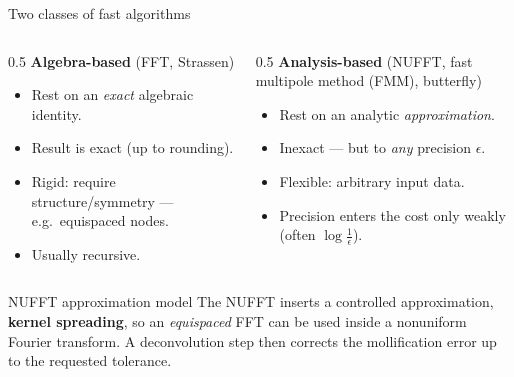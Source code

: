 \documentclass[aspectratio=169,11pt]{beamer}
\newcommand{\hl}[1]{{\color{CCMorange}\textbf{#1}}}
\begin{document}
\begin{frame}{Two classes of fast algorithms}
\small
\begin{columns}[T,totalwidth=\textwidth]
\begin{column}{0.5\textwidth}
\hl{Algebra-based} (FFT, Strassen)
\begin{itemize}\itemsep2pt
  \item Rest on an \emph{exact} algebraic identity.
  \item Result is exact (up to rounding).
  \item Rigid: require structure/symmetry --- e.g.\ equispaced nodes.
  \item Usually recursive.
\end{itemize}
\end{column}
\begin{column}{0.5\textwidth}
\hl{Analysis-based} (NUFFT, fast multipole method (FMM), butterfly)
\begin{itemize}\itemsep2pt
  \item Rest on an analytic \emph{approximation}.
  \item Inexact --- but to \emph{any} precision \(\epsilon\).
  \item Flexible: arbitrary input data.
  \item Precision enters the cost only weakly (often \(\log\tfrac1\epsilon\)).
\end{itemize}
\end{column}
\end{columns}
\vspace{3mm}
\begin{block}{NUFFT approximation model}
The NUFFT inserts a controlled approximation, \hl{kernel spreading}, so an
\emph{equispaced} FFT can be used inside a nonuniform Fourier transform. A
deconvolution step then corrects the mollification error up to the requested
tolerance.
\end{block}
\end{frame}
\end{document}
